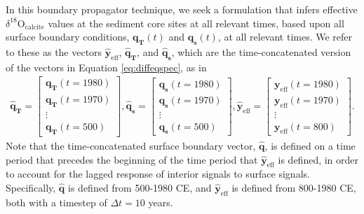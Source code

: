 \documentclass[draft]{agujournal2019}
\begin{document}
In this boundary propagator technique, we seek a formulation that infers effective $\delta^{18}\mathrm{O}_{\mathrm{calcite}}$ values at the sediment core sites at all relevant times, based upon all surface boundary conditions, $\mathbf{q_{T}}(t)$ and $\mathbf{q_{s}}(t)$, at all relevant times. We refer to these as the vectors $\mathbf{\hat{y}}_{\mathrm{eff}}$, $\mathbf{\hat{q}_{T}}$, and $\mathbf{\hat{q}_{s}}$, which are the time-concatenated version of the vectors in Equation \ref{eq:diffeqspec}, as in 
\begin{align}
  \label{eq:expand} 
\mathbf{\hat{q}_{T}} = \begin{bmatrix}
                         \mathbf{q_{T}}(t = 1980)\\
                         \mathbf{q_{T}}(t = 1970)\\
                         \vdots \\
                         \mathbf{q_{T}}(t = 500)
                        \end{bmatrix},
\mathbf{\hat{q}_{s}} = \begin{bmatrix}
                         \mathbf{q_{s}}(t = 1980)\\
                         \mathbf{q_{s}}(t = 1970)\\
                         \vdots \\
                         \mathbf{q_{s}}(t = 500)
                        \end{bmatrix},
\mathbf{\hat{y}}_{\mathrm{eff}} = \begin{bmatrix}
                         \mathbf{y}_{\mathrm{eff}}(t = 1980)\\
                         \mathbf{y}_{\mathrm{eff}}(t = 1970)\\
                         \vdots \\
                         \mathbf{y}_{\mathrm{eff}}(t = 800)
                         \end{bmatrix}.                         
\end{align}
Note that the time-concatenated surface boundary vector, $\mathbf{\hat{q}}$, is defined on a time period that precedes the beginning of the time period that $\mathbf{\hat{y}}_{\mathrm{eff}}$ is defined, in order to account for the lagged response of interior signals to surface signals. Specifically, $\mathbf{\hat{q}}$ is defined from 500-1980 CE, and $\mathbf{\hat{y}}_{\mathrm{eff}}$ is defined from 800-1980 CE, both with a timestep of $\Delta t = 10$ years. 
\end{document}
